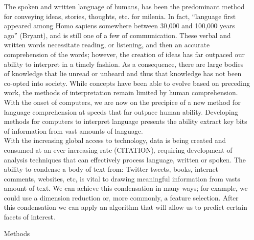 \documentclass[]{article}
\begin{document}
The spoken and written language of humans, has been the predominant
method for conveying ideas, stories, thoughts, etc. for milenia. In
fact, ``language first appeared among Homo sapiens somewhere between
30,000 and 100,000 years ago'' (Bryant), and is still one of a few of
communication. These verbal and written words necessitate reading, or
listening, and then an accurate comprehension of the words; however, the
creation of ideas has far outpaced our ability to interpret in a timely
fashion. As a consequence, there are large bodies of knowledge that lie
unread or unheard and thus that knowledge has not been co-opted into
society. While concepts have been able to evolve based on preceding
work, the methods of interpretation remain limited by human
comprehension. With the onset of computers, we are now on the precipice
of a new method for language comprehension at speeds that far outpace
human ability. Developing methods for computers to interpret language
presents the ability extract key bits of information from vast amounts
of language.\\
With the increasing global access to technology, data is being created
and consumed at an ever increasing rate (CITATION), requiring
development of analysis techniques that can effectively process
language, written or spoken. The ability to condense a body of text
from: Twitter tweets, books, internet comments, websites, etc, is vital
to drawing meaningful information from vasts amount of text. We can
achieve this condensation in many ways; for example, we could use a
dimension reduction or, more commonly, a feature selection. After this
condensation we can apply an algorithm that will allow us to predict
certain facets of interest.

Methods
\end{document}
